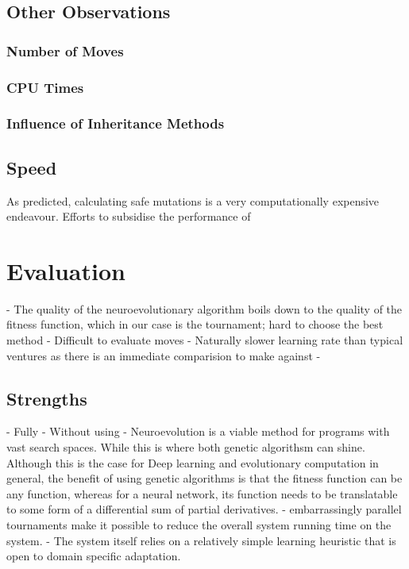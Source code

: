 \documentclass[12pt,a4paper]{article}
\begin{document}
    \subsection{Other Observations}
        \subsubsection{Number of Moves}
        \subsubsection{CPU Times}
        \subsubsection{Influence of Inheritance Methods}
    \subsection{Speed}
    
    As predicted, calculating safe mutations is a very computationally expensive endeavour. Efforts to subsidise the performance of 






\section{Evaluation}
    - The quality of the neuroevolutionary algorithm boils down to the quality of the fitness function, which in our case is the tournament; hard to choose the best method
    - Difficult to evaluate moves
    - Naturally slower learning rate than typical ventures as there is an immediate comparision to make against
    - 
    \subsection{Strengths}
    - Fully
    - Without using 
    - Neuroevolution is a viable method for programs with vast search spaces. While this is where both genetic algorithsm can shine. Although this is the case for Deep learning and evolutionary computation in general, the benefit of using genetic algorithms is that the fitness function can be any function, whereas for a neural network, its function needs to be translatable to some form of a differential sum of partial derivatives. 
    - embarrassingly parallel tournaments make it possible to reduce the overall system running time on the system.
    - The system itself relies on a relatively simple learning heuristic that is open to domain specific adaptation.
\end{document}

